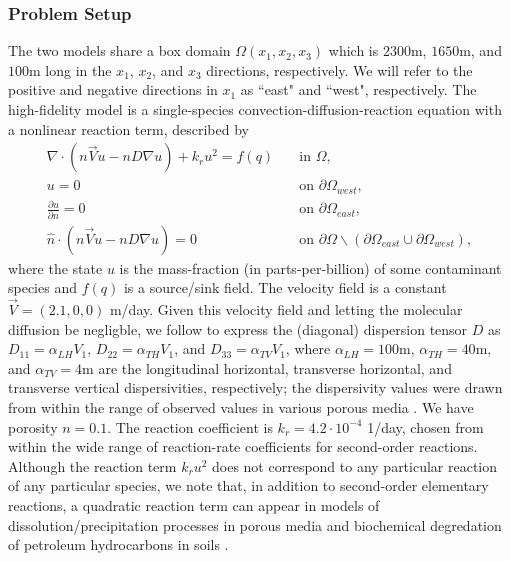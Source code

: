 \subsubsection{Problem Setup} \label{sec:setup3D_diffmesh}

The two models share a box domain $\Omega(x_1,x_2,x_3)$ which is $2300$m, $1650$m, and $100$m long in the $x_1$, $x_2$, and $x_3$ directions, respectively. We will refer to the positive and negative directions in $x_1$ as ``east" and ``west", respectively. The high-fidelity model is a single-species convection-diffusion-reaction equation with a nonlinear reaction term, described by
%
\begin{subequations}
\label{eq:cdvcdrHF3D}
\begin{align}
\nabla\cdot(n\vec{V}u - nD\nabla u) + k_ru^2 = f(q) \quad &\text{in } \Omega, \label{eq:HFeq3D}\\
u = 0 \quad &\text{on } \partial \Omega_{west}, \\
\frac{\partial u}{\partial n} = 0 \quad &\text{on }\partial\Omega_{east}, \\
\hat{n}\cdot(n\vec{V}u - nD\nabla u) = 0 \quad &\text{on }\partial\Omega\backslash(\partial\Omega_{east}\cup\partial\Omega_{west}),
\end{align} 
\end{subequations}
%
where the state $u$ is the mass-fraction (in parts-per-billion) of some contaminant species and $f(q)$ is a source/sink field. The velocity field is a constant $\vec{V}=(2.1,0,0)$ m/day. Given this velocity field and letting the molecular diffusion be negligble, we follow \cite{Vestedetal93} to express the (diagonal) dispersion tensor $D$ as $D_{11}=\alpha_{LH}V_1$, $D_{22}=\alpha_{TH}V_1$, and $D_{33}=\alpha_{TV}V_1$, where $\alpha_{LH}=100$m, $\alpha_{TH}=40$m, and $\alpha_{TV}=4$m are the longitudinal horizontal, transverse horizontal, and transverse vertical dispersivities, respectively; the dispersivity values were drawn from within the range of observed values in various porous media \cite{Davis86}. We have porosity $n=0.1$. The reaction coefficient is $k_r=4.2\cdot10^{-4}$ 1/day, chosen from within the wide range of reaction-rate coefficients for second-order reactions. Although the reaction term $k_ru^2$ does not correspond to any particular reaction of any particular species, we note that, in addition to second-order elementary reactions, a quadratic reaction term can appear in models of dissolution/precipitation processes in porous media \cite{Aha97} and biochemical degredation of petroleum hydrocarbons in soils \cite{Jack94}.

